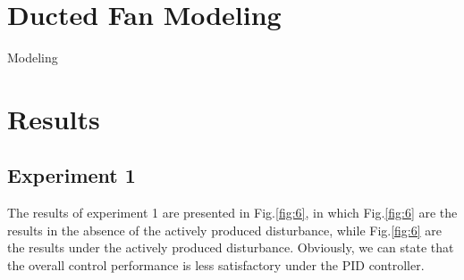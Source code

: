 \section{Ducted Fan Modeling}
Modeling
\section{Results}
\subsection{Experiment 1} 
	\label{Experiment_1}
	The results of experiment 1 are presented in Fig.\ref{fig:6}, in which Fig.\ref{fig:6}    are the results in the absence of  the actively produced disturbance, while Fig.\ref{fig:6}    are the results under the actively produced disturbance. Obviously, we can state that the overall control performance is less satisfactory under the PID controller. 
	
